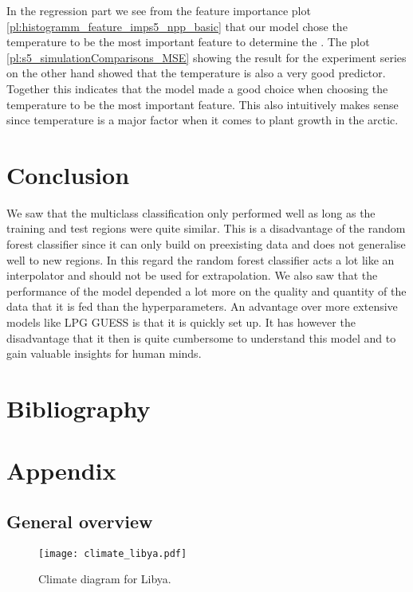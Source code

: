 In the regression part we see from the feature importance plot \ref{pl:histogramm_feature_imps5_npp_basic} that our model chose the temperature to be the most important feature to determine the
. The plot \ref{pl:s5_simulationComparisons_MSE} showing the result for the experiment series on the other hand showed that the temperature is also a very good predictor.
Together this indicates that the model made a good choice when choosing the temperature to be the most important feature.
This also intuitively makes sense since temperature is a major factor when it comes to plant growth in the arctic.

\section{Conclusion}

We saw that the multiclass classification only performed well as long as the training and
test regions were
quite similar. This is a disadvantage of the random forest classifier since it can only
build on preexisting data and does not generalise well to new regions.
In this regard the random forest classifier acts a lot like an interpolator
and should not be used for extrapolation.
We also saw that the performance of the model depended a lot more on the
quality and quantity of the data that it is fed than the hyperparameters.
An advantage over more extensive models like LPG GUESS is that it is quickly set up.
It has however the disadvantage that it then is quite cumbersome to understand this model
and to gain valuable insights for human minds.


\section*{Bibliography}
\nocite{*}
\printbibliography[heading=none, keyword={secondary}]

\clearpage
\section{Appendix}
\subsection{General overview}

\begin{figure}[h]
  \centering
  \texttt{[image: climate\_libya.pdf]}
  \caption{Climate diagram for Libya.}
  \label{fi:climate_libya}
\end{figure}

